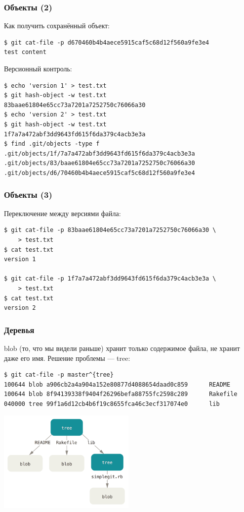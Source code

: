 \documentclass[xetex,mathserif,serif]{beamer}
\begin{document}
    \begin{frame}[fragile]
        \frametitle{Объекты (2)}
        Как получить сохранённый объект:
        \begin{verbatim}
$ git cat-file -p d670460b4b4aece5915caf5c68d12f560a9fe3e4
test content
        \end{verbatim}

        Версионный контроль:
        \begin{verbatim}
$ echo 'version 1' > test.txt
$ git hash-object -w test.txt
83baae61804e65cc73a7201a7252750c76066a30
$ echo 'version 2' > test.txt
$ git hash-object -w test.txt
1f7a7a472abf3dd9643fd615f6da379c4acb3e3a
$ find .git/objects -type f
.git/objects/1f/7a7a472abf3dd9643fd615f6da379c4acb3e3a
.git/objects/83/baae61804e65cc73a7201a7252750c76066a30
.git/objects/d6/70460b4b4aece5915caf5c68d12f560a9fe3e4
        \end{verbatim}
    \end{frame}

    \begin{frame}[fragile]
        \frametitle{Объекты (3)}
        Переключение между версиями файла:
        \begin{verbatim}
$ git cat-file -p 83baae61804e65cc73a7201a7252750c76066a30 \
    > test.txt
$ cat test.txt
version 1

$ git cat-file -p 1f7a7a472abf3dd9643fd615f6da379c4acb3e3a \
    > test.txt
$ cat test.txt
version 2
        \end{verbatim}
    \end{frame}

    \begin{frame}[fragile]
        \frametitle{Деревья}
        blob (то, что мы видели раньше) хранит только содержимое файла, не хранит даже его имя. Решение проблемы --- tree:
        \begin{scriptsize}
        \begin{verbatim}
$ git cat-file -p master^{tree}
100644 blob a906cb2a4a904a152e80877d4088654daad0c859      README
100644 blob 8f94139338f9404f26296befa88755fc2598c289      Rakefile
040000 tree 99f1a6d12cb4b6f19c8655fca46c3ecf317074e0      lib
        \end{verbatim}
        \end{scriptsize}
        \begin{center}
            \includegraphics[width=0.5\textwidth]{gitTreeObject.png}
        \end{center}
    \end{frame}
\end{document}
